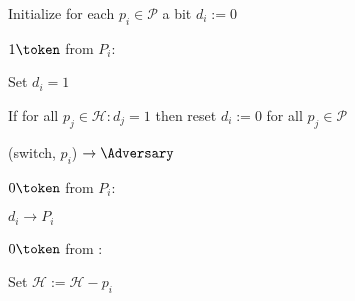 \begin{bbox}[title={Functionality $\F_{\msf{clock}}(\mathcal{P})$}]

Initialize for each $p_i \in \mathcal{P}$ a bit $d_i := 0$

\OnInput {} \color{red} $1 \token$ \color{black} from $P_i$:
	\begin{renumerate}
	\item Set $d_i = 1$
	\item If for all $p_j \in \mathcal{H} : d_j = 1$ then reset $d_i := 0$ for all $p_j \in \mathcal{P}$
	\item \Send (switch, $p_i$) $\rightarrow \Adversary$
	\end{renumerate}

\OnInput {} \color{red} $0 \token$ \color{black} from $P_i$:
	\begin{renumerate}
	\item \Send $d_i \rightarrow P_i$
	\end{renumerate}

\OnInput {} \color{red} $0 \token$ \color{black} from \Adversary:
	\begin{renumerate}
	\item Set $\mathcal{H} := \mathcal{H} - p_i$
	\end{renumerate}
\end{bbox}
